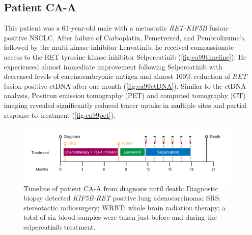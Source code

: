 
\clearpage

\subsection{Patient CA-A}
\label{cascade-sec:CA99}

This patient was a 61-year-old male  with a metastatic \textit{RET-KIF5B} fusion-positive NSCLC. After  failure of Carboplatin, Pemetrexed, and Pembrolizumab, followed by the multi-kinase inhibitor Lenvatinib, he  received compassionate access to the RET tyrosine kinase inhibitor Selpercatinib (\autoref{fig:ca99timeline}). He experienced almost immediate improvement following Selpercatinib with decreased levels of carcinoembryonic antigen and almost 100\% reduction of \textit{RET} fusion-positive ctDNA after one month (\autoref{fig:ca99ctDNA}). Similar to the ctDNA analysis, Positron emission tomography (PET) and computed tomography (CT) imaging revealed significantly reduced tracer uptake in multiple sites and partial response to treatment (\autoref{fig:ca99pet}).

\begin{figure}[ht]
\centering
\includegraphics[width=.99\linewidth]{Figures/CASCADE/CA99/CA-A_timeline}
\caption[Timeline of patient CA-A from diagnosis until death]{Timeline of patient CA-A from diagnosis until death: Diagnostic biopsy detected \textit{KIF5B-RET} positive lung adenocarcinoma; SRS: stereotactic radiosurgery; WRBT: whole brain radiation therapy; a total of six blood samples were taken just before and during the selpercatinib treatment.} \label{fig:ca99timeline}
\end{figure}


